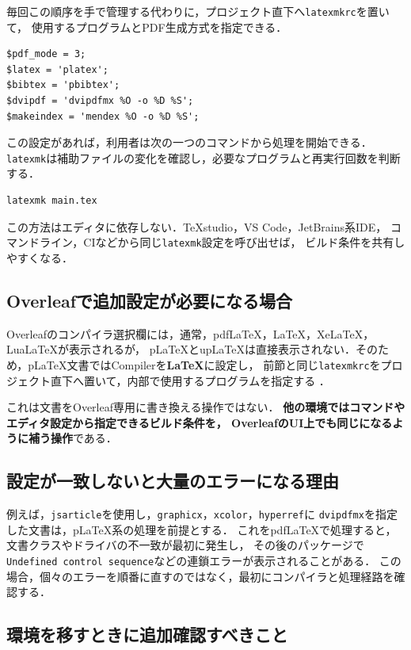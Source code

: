 \documentclass[a4paper,11pt]{jsarticle}
\newcommand{\code}[1]{\texttt{#1}}
\begin{document}
毎回この順序を手で管理する代わりに，プロジェクト直下へ\code{latexmkrc}を置いて，
使用するプログラムとPDF生成方式を指定できる．

\begin{lstlisting}
$pdf_mode = 3;
$latex = 'platex';
$bibtex = 'pbibtex';
$dvipdf = 'dvipdfmx %O -o %D %S';
$makeindex = 'mendex %O -o %D %S';
\end{lstlisting}

この設定があれば，利用者は次の一つのコマンドから処理を開始できる．
\code{latexmk}は補助ファイルの変化を確認し，必要なプログラムと再実行回数を判断する．

\begin{lstlisting}
latexmk main.tex
\end{lstlisting}

この方法はエディタに依存しない．TeXstudio，VS Code，JetBrains系IDE，
コマンドライン，CIなどから同じ\code{latexmk}設定を呼び出せば，
ビルド条件を共有しやすくなる．

\subsection{Overleafで追加設定が必要になる場合}

Overleafのコンパイラ選択欄には，通常，pdfLaTeX，LaTeX，XeLaTeX，LuaLaTeXが表示されるが，
pLaTeXとupLaTeXは直接表示されない．そのため，pLaTeX文書ではCompilerを\textbf{LaTeX}に設定し，
前節と同じ\code{latexmkrc}をプロジェクト直下へ置いて，内部で使用するプログラムを指定する
\cite{overleaf-japanese,overleaf-latexmkrc}．

これは文書をOverleaf専用に書き換える操作ではない．
\textbf{他の環境ではコマンドやエディタ設定から指定できるビルド条件を，
OverleafのUI上でも同じになるように補う操作}である．

\subsection{設定が一致しないと大量のエラーになる理由}

例えば，\code{jsarticle}を使用し，\code{graphicx}，\code{xcolor}，\code{hyperref}に
\code{dvipdfmx}を指定した文書は，pLaTeX系の処理を前提とする．
これをpdfLaTeXで処理すると，文書クラスやドライバの不一致が最初に発生し，
その後のパッケージで\code{Undefined control sequence}などの連鎖エラーが表示されることがある．
この場合，個々のエラーを順番に直すのではなく，最初にコンパイラと処理経路を確認する．

\subsection{環境を移すときに追加確認すべきこと}
\end{document}

